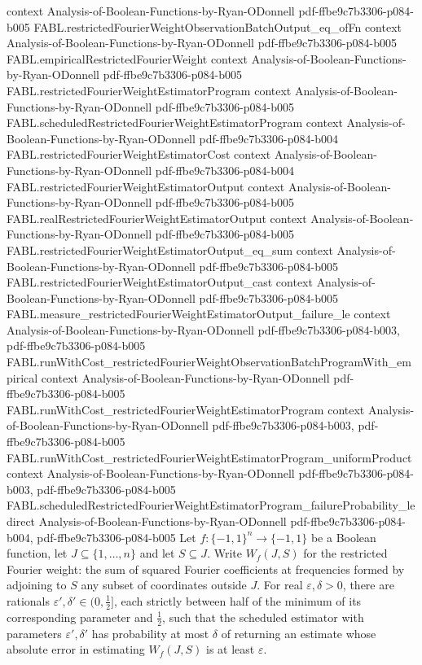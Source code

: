 \begin{theorem}
  {context}
  {Analysis-of-Boolean-Functions-by-Ryan-ODonnell}
  {pdf-ffbe9c7b3306-p084-b005}
\proofstep
  {FABL.restrictedFourierWeightObservationBatchOutput_eq_ofFn}
  {context}
  {Analysis-of-Boolean-Functions-by-Ryan-ODonnell}
  {pdf-ffbe9c7b3306-p084-b005}
\proofstep
  {FABL.empiricalRestrictedFourierWeight}
  {context}
  {Analysis-of-Boolean-Functions-by-Ryan-ODonnell}
  {pdf-ffbe9c7b3306-p084-b005}
\proofstep
  {FABL.restrictedFourierWeightEstimatorProgram}
  {context}
  {Analysis-of-Boolean-Functions-by-Ryan-ODonnell}
  {pdf-ffbe9c7b3306-p084-b005}
\proofstep
  {FABL.scheduledRestrictedFourierWeightEstimatorProgram}
  {context}
  {Analysis-of-Boolean-Functions-by-Ryan-ODonnell}
  {pdf-ffbe9c7b3306-p084-b004}
\proofstep
  {FABL.restrictedFourierWeightEstimatorCost}
  {context}
  {Analysis-of-Boolean-Functions-by-Ryan-ODonnell}
  {pdf-ffbe9c7b3306-p084-b004}
\proofstep
  {FABL.restrictedFourierWeightEstimatorOutput}
  {context}
  {Analysis-of-Boolean-Functions-by-Ryan-ODonnell}
  {pdf-ffbe9c7b3306-p084-b005}
\proofstep
  {FABL.realRestrictedFourierWeightEstimatorOutput}
  {context}
  {Analysis-of-Boolean-Functions-by-Ryan-ODonnell}
  {pdf-ffbe9c7b3306-p084-b005}
\proofstep
  {FABL.restrictedFourierWeightEstimatorOutput_eq_sum}
  {context}
  {Analysis-of-Boolean-Functions-by-Ryan-ODonnell}
  {pdf-ffbe9c7b3306-p084-b005}
\proofstep
  {FABL.restrictedFourierWeightEstimatorOutput_cast}
  {context}
  {Analysis-of-Boolean-Functions-by-Ryan-ODonnell}
  {pdf-ffbe9c7b3306-p084-b005}
\proofstep
  {FABL.measure_restrictedFourierWeightEstimatorOutput_failure_le}
  {context}
  {Analysis-of-Boolean-Functions-by-Ryan-ODonnell}
  {pdf-ffbe9c7b3306-p084-b003,
    pdf-ffbe9c7b3306-p084-b005}
\proofstep
  {FABL.runWithCost_restrictedFourierWeightObservationBatchProgramWith_empirical}
  {context}
  {Analysis-of-Boolean-Functions-by-Ryan-ODonnell}
  {pdf-ffbe9c7b3306-p084-b005}
\proofstep
  {FABL.runWithCost_restrictedFourierWeightEstimatorProgram}
  {context}
  {Analysis-of-Boolean-Functions-by-Ryan-ODonnell}
  {pdf-ffbe9c7b3306-p084-b003,
    pdf-ffbe9c7b3306-p084-b005}
\proofstep
  {FABL.runWithCost_restrictedFourierWeightEstimatorProgram_uniformProduct}
  {context}
  {Analysis-of-Boolean-Functions-by-Ryan-ODonnell}
  {pdf-ffbe9c7b3306-p084-b003,
    pdf-ffbe9c7b3306-p084-b005}
\proofstep
  {FABL.scheduledRestrictedFourierWeightEstimatorProgram_failureProbability_le}
  {direct}
  {Analysis-of-Boolean-Functions-by-Ryan-ODonnell}
  {pdf-ffbe9c7b3306-p084-b004,
    pdf-ffbe9c7b3306-p084-b005}
Let $f:\{-1,1\}^n\to\{-1,1\}$ be a Boolean function, let $J\subseteq\{1,\ldots,n\}$ and
let $S\subseteq J$. Write $W_f(J,S)$ for the restricted Fourier weight: the sum of
squared Fourier coefficients at frequencies formed by adjoining to $S$ any subset of
coordinates outside $J$. For real $\varepsilon,\delta>0$, there are rationals
$\varepsilon',\delta'\in(0,\tfrac12]$, each strictly between half of the minimum of its
corresponding parameter and $\tfrac12$, such that the scheduled estimator with
parameters $\varepsilon',\delta'$ has probability at most $\delta$ of returning an
estimate whose absolute error in estimating $W_f(J,S)$ is at least $\varepsilon$.
\end{theorem}

